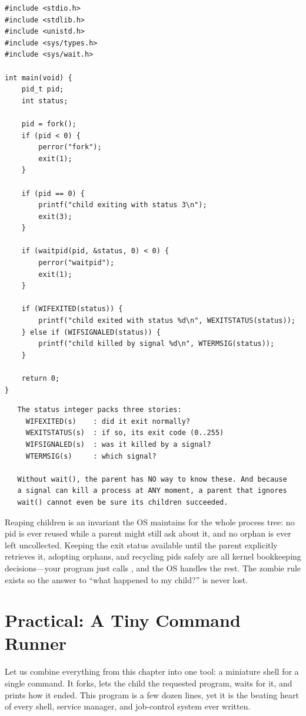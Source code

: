 \begin{lstlisting}[caption={waitpid with the exit-status macros.}]
#include <stdio.h>
#include <stdlib.h>
#include <unistd.h>
#include <sys/types.h>
#include <sys/wait.h>

int main(void) {
    pid_t pid;
    int status;

    pid = fork();
    if (pid < 0) {
        perror("fork");
        exit(1);
    }

    if (pid == 0) {
        printf("child exiting with status 3\n");
        exit(3);
    }

    if (waitpid(pid, &status, 0) < 0) {
        perror("waitpid");
        exit(1);
    }

    if (WIFEXITED(status)) {
        printf("child exited with status %d\n", WEXITSTATUS(status));
    } else if (WIFSIGNALED(status)) {
        printf("child killed by signal %d\n", WTERMSIG(status));
    }

    return 0;
}
\end{lstlisting}

\begin{verbatim}
   The status integer packs three stories:
     WIFEXITED(s)    : did it exit normally?
     WEXITSTATUS(s)  : if so, its exit code (0..255)
     WIFSIGNALED(s)  : was it killed by a signal?
     WTERMSIG(s)     : which signal?

   Without wait(), the parent has NO way to know these. And because
   a signal can kill a process at ANY moment, a parent that ignores
   wait() cannot even be sure its children succeeded.
\end{verbatim}

\begin{osconcept}
Reaping children is an invariant the OS maintains for the whole
process tree: no pid is ever reused while a parent might still ask
about it, and no orphan is ever left uncollected. Keeping the exit
status available until the parent explicitly retrieves it, adopting
orphans, and recycling pids safely are all kernel bookkeeping
decisions---your program just calls , and the OS handles
the rest. The zombie rule exists so the answer to ``what happened to my
child?'' is never lost.
\end{osconcept}

\section{Practical: A Tiny Command Runner}

Let us combine everything from this chapter into one tool: a miniature
shell for a single command. It forks, lets the child  the
requested program, waits for it, and prints how it ended. This program
is a few dozen lines, yet it is the beating heart of every shell,
service manager, and job-control system ever written.

